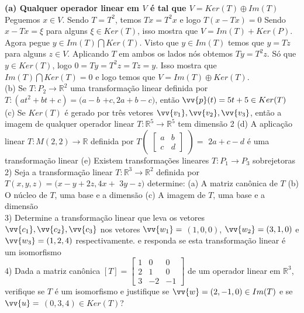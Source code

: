 \documentclass[11pt,a4paper]{article}
\newcommand\tab[1][1.835cm]{\hspace*{#1}}
\newcommand\taba[1][2.55cm]{\hspace*{#1}}
\begin{document}
\begin{flushleft}
\taba \textbf{(a) Qualquer operador linear em $V$ é tal que $V = Ker(T) \oplus Im(T)$} \linebreak
\taba Peguemos $x \in V$. Sendo $T = T^2$, temos $Tx = T^2x$ e logo $T(x-Tx) = 0$ \linebreak
\taba Sendo $x-Tx = \xi$ para alguns $\xi \in Ker(T)$, isso mostra que $V = Im(T) + Ker(P)$.
\taba Agora pegue $y \in Im(T) \bigcap Ker(T)$. Visto que $y \in Im(T)$ temos que $y = Tz$ para alguns $z \in V$. Aplicando $T$ em ambos os lados nós obtemos $Ty = T^2z$. Só que $y \in Ker(T)$,  logo $0 = Ty = T^2z = Tz = y$. Isso mostra que $Im(T) \bigcap Ker(T) = 0 $ e logo temos que $V = Im(T) \oplus Ker(T)$. \linebreak
\\
\taba (b) Se $T:P_2\rightarrow\mathbb{R}^2$ uma transformação linear definida por $T:(at^2+bt+c) = (a-b$ $+c,  2a +b-c)$, então $\vv{p}(t)=5t+5 \in Ker(T)$ \linebreak
\taba (c) Se $Ker(T)$ é gerado por três vetores $\vv{v_1}, \vv{v_2}, \vv{v_3}$, então a imagem de qualquer operador linear $T:\mathbb{R}^5\rightarrow\mathbb{R}^5$ tem dimensão 2\linebreak
\taba (d) A aplicação linear $T:M(2,2)\rightarrow\mathbb{R}$ definida por $T\begin{pmatrix}\begin{bmatrix} a & b \\c & d\end{bmatrix}\end{pmatrix} = $ $2a+c-d$ é uma transformação linear\linebreak
\taba (e) Existem transformações lineares $T:P_1 \rightarrow P_3$ sobrejetoras\linebreak
\\
\tab 2) Seja a transformação linear $T:\mathbb{R}^3 \rightarrow \mathbb{R}^2$ definida por $T(x,y,z) = (x-y+2z,4x+ $ $3y-z)$ determine: \linebreak
\taba(a) A matriz canônica de $T$ \linebreak
\taba(b) O núcleo de $T$, uma base e a dimensão \linebreak
\taba(c) A imagem de $T$, uma base e a dimensão \linebreak
\\
\tab 3) Determine a transformação linear que leva os vetores $\vv{c_1}, \vv{c_2}, \vv{c_3}$ nos vetores $\vv{w_1}=$ $(1,0,0)$, $\vv{w_2}=(3,1,0)$ e $\vv{w_3}=(1,2,4)$ respectivamente. e responda se esta transformação linear é um isomorfismo\linebreak
\\
\tab 4) Dada a matriz canônica $[T]= \begin{bmatrix}
1 & 0 & 0\\ 2 & 1 & 0\\ 3 & -2 & -1 \end{bmatrix}$ de um operador linear em $\mathbb{R}^3$, verifique se $T$ é um isomorfismo e justifique se $\vv{w}=(2,-1,0) \in Im(T)$ e se $\vv{u}= $ $(0,3,4) \in Ker(T)$?\linebreak




\end{flushleft}
\end{document}
